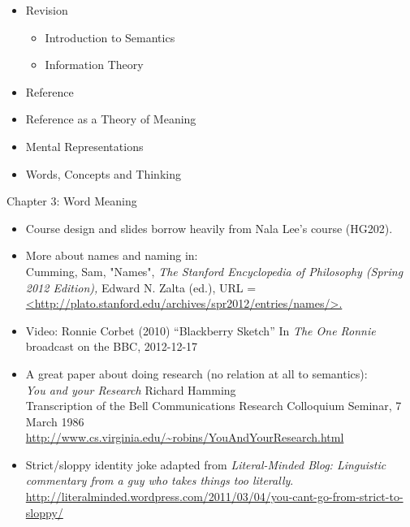 \documentclass[headrule,footrule]{foils}
\begin{document}
\begin{itemize}
\item Revision
  \begin{itemize}
  \item Introduction to Semantics
  \item Information Theory
  \end{itemize}
\item Reference
\item Reference as a Theory of Meaning
\item Mental Representations
\item Words, Concepts and Thinking
\end{itemize}


 Chapter 3: Word Meaning


\MyLogo{}
\begin{itemize}
\item Course design and slides borrow heavily from Nala Lee's course (HG202).
\item More about names and naming in: \\
Cumming, Sam, "Names", \textit{The Stanford Encyclopedia of Philosophy (Spring 2012 Edition),} Edward N. Zalta (ed.), 
URL = \url{<http://plato.stanford.edu/archives/spr2012/entries/names/>.} 
\item Video: Ronnie Corbet (2010) ``Blackberry Sketch'' In \textit{The One Ronnie}
broadcast on the BBC, 2012-12-17 
\item A great paper about doing research (no relation at all to semantics):
\\
\textit{You and your Research}  Richard Hamming
\\ Transcription of the Bell Communications Research Colloquium Seminar, 7 March 1986 
\\ \url{http://www.cs.virginia.edu/~robins/YouAndYourResearch.html}
\item Strict/sloppy identity joke adapted from \textit{Literal-Minded Blog:
Linguistic commentary from a guy who takes things too literally}.
\\ \footnotesize\url{http://literalminded.wordpress.com/2011/03/04/you-cant-go-from-strict-to-sloppy/}


\end{itemize}

\small



\clearpage
\end{document}
